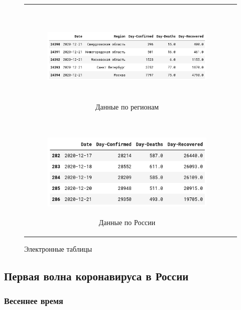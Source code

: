 \documentclass[a4paper, 12pt]{extarticle}
\begin{document}
\begin{figure}[h]
    \centering
    \begin{tabular}[c]{cc}
    \begin{subfigure}[b]{\textwidth} \centering
        \includegraphics[height=130pt]{../plots/regions_df2.png}
        \caption{Данные по регионам} \label{fig:regions_df2}
    \end{subfigure}& \\

    \begin{subfigure}[b]{\textwidth} \centering
        \includegraphics[height=130pt]{../plots/country_df2.png}
        \caption{Данные по России} \label{fig:country_df2}
    \end{subfigure}
    \end{tabular}
    \caption{Электронные таблицы} \label{fig:collection2_res}
\end{figure}

\clearpage
\newpage

\subsection{Первая волна коронавируса в России}

\subsubsection{Весеннее время}
\end{document}
